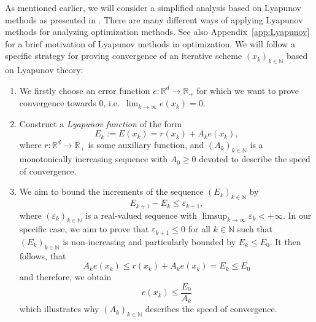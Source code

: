 \documentclass[12pt,openany]{book}
\theoremstyle{definition}
\theoremstyle{definition}
\newcommand{\N}{\mathbb{N}}
\newcommand{\R}{\mathbb{R}}
\begin{document}
As mentioned earlier, we will consider a simplified analysis based on Lyapunov methods as presented in \cite{Wilson2021}. There are many different ways of applying Lyapunov methods for analyzing optimization methods. See also Appendix~\ref{app:Lyapunov} for a brief motivation of Lyapunov methods in optimization. We will follow a specific strategy for proving convergence of an iterative scheme $(x_k)_{k\in\N}$ based on Lyapunov theory:
\begin{enumerate}
\item We firstly choose an error function $e:\R^d\to\R_+$ for which we want to prove convergence towards $0$, i.e.~$\lim_{k\to\infty}e(x_k)=0$. 
\item Construct a \textit{Lyapunov function} of the form
\[E_k :=E(x_k) = r(x_k) + A_k e(x_k), \]
where $r:\R^d\to\R_+$ is some auxiliary function, and $(A_k)_{k\in\N}$ is a monotonically increasing sequence with $A_0\ge0$ devoted to describe the speed of convergence. 
\item We aim to bound the increments of the sequence $(E_k)_{k\in\N}$ by
\[E_{k+1} - E_k \le \varepsilon_{k+1}, \]
where $(\varepsilon_{k})_{k\in\N}$ is a real-valued sequence with $\limsup_{k\to\infty}\varepsilon_k<+\infty$.  In our specific case, we aim to prove that $\varepsilon_{k+1}\le 0$ for all $k\in\N$ such that $(E_k)_{k\in\N}$ is non-increasing and particularly bounded by $E_k\le E_0$. It then follows, that 
\[A_k e(x_k) \le r(x_k) + A_k e(x_k) = E_k\le E_0\]
and therefore, we obtain
\[ e(x_k) \le \frac{E_0}{A_k}\]
which illustrates why $(A_k)_{k\in\N}$ describes the speed of convergence.
\end{enumerate}

\medskip
\end{document}
